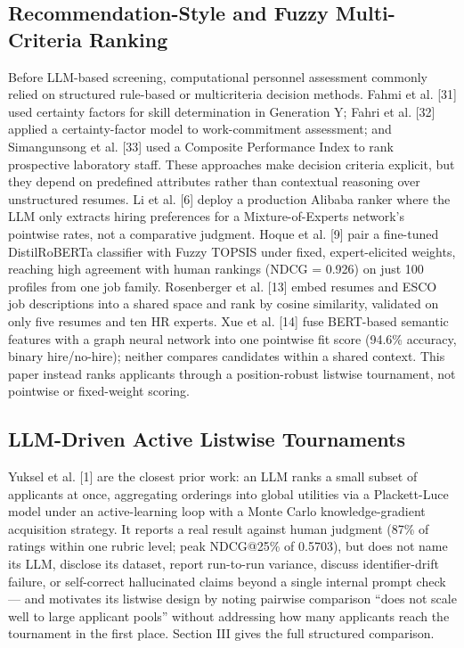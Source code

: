 \documentclass[journal]{IEEEtran}
\begin{document}
\subsection{Recommendation-Style and Fuzzy Multi-Criteria Ranking}
Before LLM-based screening, computational personnel assessment commonly relied on structured rule-based or multicriteria decision methods. Fahmi et al. [31] used certainty factors for skill determination in Generation Y; Fahri et al. [32] applied a certainty-factor model to work-commitment assessment; and Simangunsong et al. [33] used a Composite Performance Index to rank prospective laboratory staff. These approaches make decision criteria explicit, but they depend on predefined attributes rather than contextual reasoning over unstructured resumes. Li et al. [6] deploy a production Alibaba ranker where the LLM only extracts hiring preferences for a Mixture-of-Experts network's pointwise rates, not a comparative judgment. Hoque et al. [9] pair a fine-tuned DistilRoBERTa classifier with Fuzzy TOPSIS under fixed, expert-elicited weights, reaching high agreement with human rankings (NDCG = 0.926) on just 100 profiles from one job family. Rosenberger et al. [13] embed resumes and ESCO job descriptions into a shared space and rank by cosine similarity, validated on only five resumes and ten HR experts. Xue et al. [14] fuse BERT-based semantic features with a graph neural network into one pointwise fit score (94.6\% accuracy, binary hire/no-hire); neither compares candidates within a shared context. This paper instead ranks applicants through a position-robust listwise tournament, not pointwise or fixed-weight scoring.

\subsection{LLM-Driven Active Listwise Tournaments}
Yuksel et al. [1] are the closest prior work: an LLM ranks a small subset of applicants at once, aggregating orderings into global utilities via a Plackett-Luce model under an active-learning loop with a Monte Carlo knowledge-gradient acquisition strategy. It reports a real result against human judgment (87\% of ratings within one rubric level; peak NDCG@25\% of 0.5703), but does not name its LLM, disclose its dataset, report run-to-run variance, discuss identifier-drift failure, or self-correct hallucinated claims beyond a single internal prompt check --- and motivates its listwise design by noting pairwise comparison ``does not scale well to large applicant pools'' without addressing how many applicants reach the tournament in the first place. Section III gives the full structured comparison.
\end{document}
